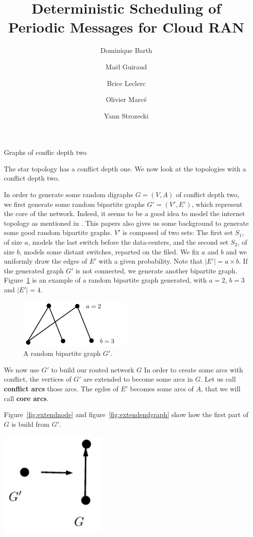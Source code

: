 \documentclass[10pt]{article}
\title{Deterministic Scheduling of Periodic Messages for Cloud RAN}
\author[1]{Dominique Barth}
\author[1,2]{Ma\"el Guiraud}
\author[2]{Brice Leclerc}
\author[2]{Olivier Marc\'e}
\author[1]{Yann Strozecki}
\affil[1]{David Laboratory, UVSQ}
\affil[2]{Nokia Bell Labs France}
\begin{document}
\begin{section}{Graphs of conflic depth two}



The star topology has a conflict depth one. We now look at the topologies with a conflict depth two.
  
In order to generate some random digraphs $G=(V,A)$ of conflict depth two, we first generate some random bipartite graphs $G'=(V',E')$, which represent the core of the network. Indeed, it seems to be a good idea to model the internet topology as mentioned in \cite{tarissan_towards_2013}. This papers also gives us some background to generate some good random bipartite graphs. 
$V'$ is composed of two sets: The first set $S_1$, of size $a$, models the last switch before the data-centers, and the second set $S_2$, of size $b$, models some distant switches, reparted on the filed. We fix $a$ and $b$ and we uniformly draw the edges of $E'$ with a given probability. Note that $|E'|= a \times b$. If the generated graph  $G'$ is not connected, we generate another bipartite graph.
Figure~\ref{fig:random23} is an example of a random bipartite graph generated, with $a = 2$, $b=3$ and $|E'|=4$.

\begin{figure}[h]
\begin{center}
\includegraphics[width=0.5\textwidth]{random23}
\caption{A random bipartite graph $G'$.}\label{fig:random23}
\end{center}
\end{figure}


We now use $G'$ to build our routed network $G$
In order to create some arcs with conflict, the vertices of $G'$ are extended to become some arcs in $G$. Let us call \textbf{conflict arcs} those arcs. The egdes of $E'$ becomes some arcs of $A$, that we will call \textbf{core arcs}.

Figure~\ref{fig:extendnode} and figure~\ref{fig:extendendgraph} show how the first part of $G$ is build from $G'$.

\begin{minipage}{.5\linewidth}

\begin{center}
\includegraphics[width=0.4\textwidth]{extendnode}
\label{fig:extendnode}
\end{center}


\end{minipage}
\end{section}
\end{document}
